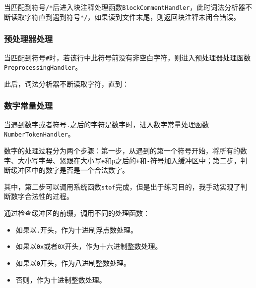 \documentclass[lang=cn,11pt,a4paper,cite=authornum]{paper}
\begin{document}
当匹配到符号\texttt{/*}后进入块注释处理函数\texttt{BlockCommentHandler}，此时词法分析器不断读取字符直到遇到符号\texttt{*/}，如果读到文件末尾，则返回块注释未闭合错误。

\subsubsection{预处理器处理}

当匹配到符号\texttt{#}时，若该行中此符号前没有非空白字符，则进入预处理器处理函数\texttt{PreprocessingHandler}。

此后，词法分析器不断读取字符，直到：

\begin{itemize}
    \item 如果遇到换行符或者文件结尾则结束。
    \item 如果遇到\texttt{\}符号，则跳过该反斜杠后的所有空白字符，如果遇到了换行，则跳过这个换行符号，之后继续预处理器的处理过程。
\end{itemize}

\subsubsection{数字常量处理}

当遇到数字或者符号\texttt{.}之后的字符是数字时，进入数字常量处理函数\texttt{NumberTokenHandler}。

\label{numberhandle}数字的处理过程分为两个步骤：第一步，从遇到的第一个符号开始，将所有的数字、大小写字母、紧跟在大小写\texttt{e}和\texttt{p}之后的\texttt{+}和\texttt{-}符号加入缓冲区中；第二步，判断缓冲区中的数字是否是一个合法数字。

其中，第二步可以调用系统函数\texttt{stof}完成，但是出于练习目的，我手动实现了判断数字合法性的过程。

通过检查缓冲区的前缀，调用不同的处理函数：

\begin{itemize}
    \item 如果以\texttt{.}开头，作为十进制浮点数处理。
    \item 如果以\texttt{0x}或者\texttt{0X}开头，作为十六进制整数处理。
    \item 如果以\texttt{0}开头，作为八进制整数处理。
    \item 否则，作为十进制整数处理。
\end{itemize}
\end{document}
